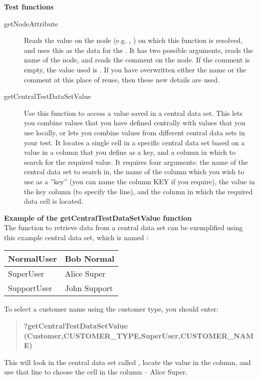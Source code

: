 \textbf{Test functions}\\
\begin{description}
\item [getNodeAttribute]{Reads the value on the node (e.g. \gdcase{}, \gdstep{}) on which this function is resolved, and uses this as the data for the \gdstep{}. It has two possible arguments,  reads the name of the node, and  reads the comment on the node. If the comment is empty, the value used is . If you have overwritten either the name or the comment at this place of reuse, then these new details are used.} 
\item [getCentralTestDataSetValue]{Use this function to access a value saved in a central data set. This lets you combine values that you have defined centrally with values that you use locally, or lets you combine values from different central data sets in your test. It locates a single cell in a specific central data set based on a value in a column that you define as a key, and a column in which to search for the required value. It requires four arguments: the name of the central data set to search in, the name of the column which you wish to use as a ''key'' (you can name the column KEY if you require), the value in the key column (to specify the line), and the column in which the required data cell is located.}
\end{description}

\textbf{Example of the getCentralTestDataSetValue function}\\
The function to retrieve data from a central data set can be exemplified using this example central data set, which is named :

\begin{supertabular}{|p{6.0cm}p{6.0cm}|}
\hline
NormalUser & Bob Normal\\
\hline
SuperUser & Alice Super\\
\hline
SupportUser & John Support \\
\hline
\end{supertabular}

 To select a customer name using the customer type, you should enter:
\begin{quote}
\textbf{?getCentralTestDataSetValue\\
(Customer,CUSTOMER\_TYPE,SuperUser,CUSTOMER\_NAME)}
\end{quote}
This will look in the central data set called , locate the value  in the  column, and use that line to choose the cell in the  column -- Alice Super. 

